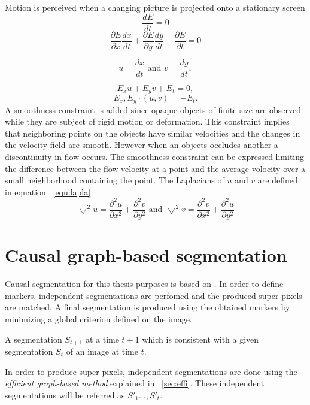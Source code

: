 Motion is perceived when a changing picture is projected onto a stationary screen
\begin{equation}
 \frac{dE}{dt} = 0
\end{equation}
\begin{equation}
 \frac{\partial E}{\partial x}\frac{dx}{dt} + \frac{\partial E}{\partial y} \frac{dy}{dt}+\frac{\partial E}{\partial t} = 0
\end{equation}

\[u= \frac{dx}{dt}\mbox{ and } v= \frac{dy}{dt},\]

\begin{equation}
 E_{x}u+E_{y}v+E_{t} = 0,
\end{equation}
\[E_{x},E_{y}\cdot (u,v)=-E_{t}.\]
A smoothness constraint is added since opaque objects of finite size are observed while they are subject of rigid motion or deformation.
This constraint implies that neighboring points on the objects have similar velocities and the changes in the velocity field are smooth. However when an objects occludes another a discontinuity in flow occurs.
The smoothness constraint can be expressed limiting the difference between the flow velocity at a point and the average volocity over a small neighborhood containing the point. The Laplacians of \(u\) and \(v\) are defined in equation ~\ref{equ:lapla} 
\begin{equation}
 \bigtriangledown^2u=\frac{\partial^2 u}{\partial x^2}+\frac{\partial^2 v}{\partial y^2} \mbox{ and } \bigtriangledown^2v=\frac{\partial^2 v}{\partial x^2}+\frac{\partial^2 u}{\partial y^2}
 \label{equ:lapla}
\end{equation}

\section{Causal graph-based segmentation} %
\label{sec:tempconsseg}

Causal segmentation for this thesis purposes is based on \textcite{couprie2013causal}. 
In order to define markers, independent segmentations are perfomed and the produced super-pixels are matched. A final segmentation is produced using the obtained markers by minimizing a global criterion defined on the image.

A segmentation \(S_{t+1}\) at a time \(t+1\) which is consistent with a given segmentation \(S_{t}\) of an image at time \(t\).

In order to produce super-pixels, independent segmentations are done using the \textit{efficient graph-based method} explained in ~\ref{sec:effi}. These independent segmentations  will be referred as \(S'_{1}...,S'_{t}\).

